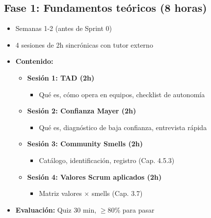 \subsection*{Fase 1: Fundamentos teóricos (8 horas)}
\begin{itemize}
    \item Semanas 1-2 (antes de Sprint 0)
    \item 4 sesiones de 2h sincrónicas con tutor externo
    \item \textbf{Contenido:}
          \begin{itemize}
              \item \textbf{Sesión 1: TAD (2h)}
                    \begin{itemize}
                        \item Qué es, cómo opera en equipos, checklist de autonomía
                    \end{itemize}
              \item \textbf{Sesión 2: Confianza Mayer (2h)}
                    \begin{itemize}
                        \item Qué es, diagnóstico de baja confianza, entrevista rápida
                    \end{itemize}
              \item \textbf{Sesión 3: Community Smells (2h)}
                    \begin{itemize}
                        \item Catálogo, identificación, registro (Cap. 4.5.3)
                    \end{itemize}
              \item \textbf{Sesión 4: Valores Scrum aplicados (2h)}
                    \begin{itemize}
                        \item Matriz valores $\times$ smells (Cap. 3.7)
                    \end{itemize}
          \end{itemize}
    \item \textbf{Evaluación:} Quiz 30 min, $\geq$80\% para pasar
\end{itemize}


